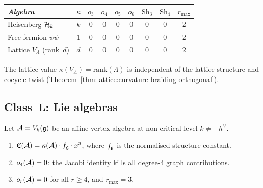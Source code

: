 \begin{example}
\label{ex:thqg-gaussian-data}
\begin{center}
\small
\renewcommand{\arraystretch}{1.15}
\begin{tabular}{lcccccccc}
\toprule
\emph{Algebra} & $\kappa$ & $o_3$ & $o_4$ & $o_5$ &
 $o_6$ & $\mathrm{Sh}_3$ & $\mathrm{Sh}_4$ & $r_{\max}$ \\
\midrule
Heisenberg $\mathcal{H}_k$ & $k$ & $0$ & $0$ & $0$ & $0$ &
 $0$ & $0$ & $2$ \\
Free fermion $\psi\bar\psi$ & $1$ & $0$ & $0$ & $0$ & $0$ &
 $0$ & $0$ & $2$ \\
Lattice $V_\Lambda$ (rank~$d$) & $d$ & $0$ & $0$ & $0$ & $0$ &
 $0$ & $0$ & $2$ \\
\bottomrule
\end{tabular}
\end{center}
The lattice value $\kappa(V_\Lambda) = \mathrm{rank}(\Lambda)$
is independent of the lattice structure and cocycle twist
(Theorem~\ref{thm:lattice:curvature-braiding-orthogonal}).
\end{example}



\subsection{Class~$\mathbf{L}$: Lie algebras}
\label{subsec:thqg-lie}

\begin{theorem}
\label{thm:thqg-lie-termination}
\ClaimStatusProvedHere
{}
Let $\mathcal{A} = V_k(\mathfrak{g})$ be an affine vertex algebra
at non-critical level $k \neq -h^\vee$.
\begin{enumerate}[label=\textup{(\roman*)}]
\item $\mathfrak{C}(\mathcal{A}) = \kappa(\mathcal{A})\cdot f_{\mathfrak{g}}\cdot x^3$,
 where $f_{\mathfrak{g}}$ is the normalised structure constant.
\item $o_4(\mathcal{A}) = 0$: the Jacobi identity kills all
 degree-$4$ graph contributions.
\item $o_r(\mathcal{A}) = 0$ for all $r \geq 4$, and $r_{\max} = 3$.
\end{enumerate}
\end{theorem}

